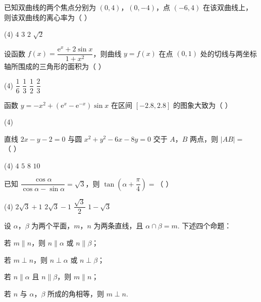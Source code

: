 \documentclass[UTF8,12pt]{ctexart}
\begin{document}
\begin{questions}
  \item 已知双曲线的两个焦点分别为 $(0,4)$，$(0,-4)$，点 $(-6,4)$ 在该双曲线上，
    则该双曲线的离心率为（ ）

    \begin{tasks}(4)
      \task $4$
      \task $3$
      \task $2$
      \task $\sqrt2$
    \end{tasks}

  \item 设函数 $f(x)=\dfrac{\mathrm{e}^x+2\sin x}{1+x^2}$，则曲线 $y=f(x)$ 在点 $(0,1)$
    处的切线与两坐标轴所围成的三角形的面积为（ ）

    \begin{tasks}(4)
      \task $\dfrac16$
      \task $\dfrac13$
      \task $\dfrac12$
      \task $\dfrac23$
    \end{tasks}

  \item 函数 $y=-x^2+(\mathrm{e}^x-\mathrm{e}^{-x})\sin x$ 在区间 $[-2.8,2.8]$
    的图象大致为（ ）

    \begin{tasks}(4)
      \task [FIGURE]
      \task [FIGURE]
      \task [FIGURE]
      \task [FIGURE]
    \end{tasks}

  \item 直线 $2x-y-2=0$ 与圆 $x^2+y^2-6x-8y=0$ 交于 $A$，$B$ 两点，则 $|AB|=$（ ）

    \begin{tasks}(4)
      \task $4$
      \task $5$
      \task $8$
      \task $10$
    \end{tasks}

  \item 已知 $\dfrac{\cos\alpha}{\cos\alpha-\sin\alpha}=\sqrt3$，则
    $\tan\left(\alpha+\dfrac\pi4\right)=$（ ）

    \begin{tasks}(4)
      \task $2\sqrt3+1$
      \task $2\sqrt3-1$
      \task $\dfrac{\sqrt3}{2}$
      \task $1-\sqrt3$
    \end{tasks}

  \item 设 $\alpha$，$\beta$ 为两个平面，$m$，$n$ 为两条直线，且 $\alpha\cap\beta=m$.
    下述四个命题：

    \begin{statements}
      \item[①] 若 $m\parallel n$，则 $n\parallel\alpha$ 或 $n\parallel\beta$；
      \item[②] 若 $m\perp n$，则 $n\perp\alpha$ 或 $n\perp\beta$；
      \item[③] 若 $n\parallel\alpha$ 且 $n\parallel\beta$，则 $m\parallel n$；
      \item[④] 若 $n$ 与 $\alpha$，$\beta$ 所成的角相等，则 $m\perp n$.
    \end{statements}


\end{questions}
\end{document}

